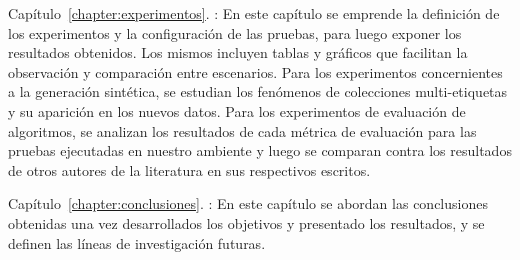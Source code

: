 \begin{description}
	\item{Capítulo~\ref{chapter:experimentos}. }:
	      En este capítulo se emprende la definición de los experimentos y la
	      configuración de las pruebas, para luego exponer los resultados
	      obtenidos. Los mismos incluyen tablas y gráficos que facilitan la
	      observación y comparación entre escenarios. Para los experimentos
	      concernientes a la generación sintética, se estudian los fenómenos de
	      colecciones multi-etiquetas y su aparición en los nuevos datos. Para los
	      experimentos de evaluación de algoritmos, se analizan los resultados de
	      cada métrica de evaluación para las pruebas ejecutadas en nuestro
	      ambiente y luego se comparan contra los resultados de otros autores de
	      la literatura en sus respectivos escritos.

	\item{Capítulo~\ref{chapter:conclusiones}. }:
	      En este capítulo se abordan las conclusiones obtenidas una vez
	      desarrollados los objetivos y presentado los resultados, y se definen
	      las líneas de investigación futuras.

\end{description}
